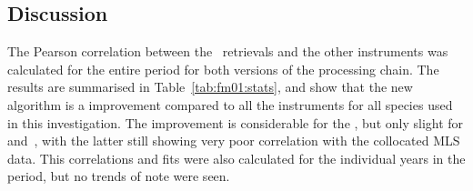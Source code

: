 \subsection{Discussion}
\label{sec:fm01:discussion}
The Pearson correlation between the \smr\ retrievals and the other instruments
was calculated for the entire period for both versions of the processing chain.
The results are summarised in Table~\ref{tab:fm01:stats}, and show that the
new algorithm is a improvement compared to all the instruments for all species
used in this investigation. The improvement is considerable for the ,
but only slight for  and~, with the latter still showing
very poor correlation with the collocated MLS data. This correlations and fits
were also calculated for the individual years in the period, but no trends of
note were seen.


